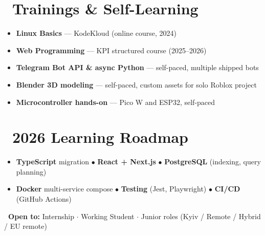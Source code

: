 \documentclass[10pt,a4paper,sans]{moderncv}
\begin{document}
\section{\faCertificate\ Trainings \& Self-Learning}
\begin{itemize}
    \item[\faBookmark] \small \textbf{Linux Basics} --- KodeKloud (online course, 2024)
    \item[\faBookmark] \small \textbf{Web Programming} --- KPI structured course (2025--2026)
    \item[\faBookmark] \small \textbf{Telegram Bot API \& async Python} --- self-paced, multiple shipped bots
    \item[\faBookmark] \small \textbf{Blender 3D modeling} --- self-paced, custom assets for solo Roblox project
    \item[\faBookmark] \small \textbf{Microcontroller hands-on} --- Pico W and ESP32, self-paced
\end{itemize}

\section{\faRoad\ 2026 Learning Roadmap}
\begin{itemize}
    \item[\faChevronRight] \small \textbf{TypeScript} migration $\bullet$ \textbf{React + Next.js} $\bullet$ \textbf{PostgreSQL} (indexing, query planning)
    \item[\faChevronRight] \small \textbf{Docker} multi-service compose $\bullet$ \textbf{Testing} (Jest, Playwright) $\bullet$ \textbf{CI/CD} (GitHub Actions)
\end{itemize}

\vspace{0.3em}
\small\textbf{\faPaperPlane\ Open to:} Internship $\cdot$ Working Student $\cdot$ Junior roles \quad (Kyiv / Remote / Hybrid / EU remote)
\end{document}
